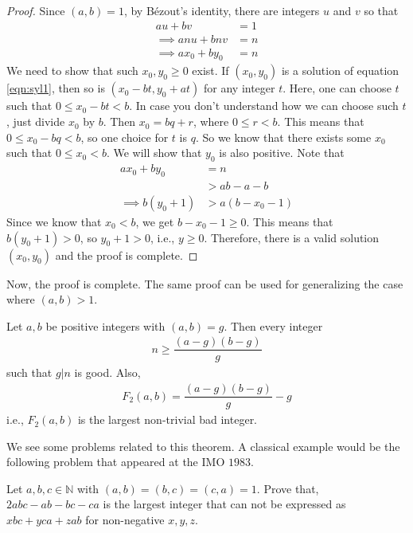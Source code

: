 \documentclass{subfile}
\begin{document}
	\begin{proof}
		Since $(a,b)=1$, by B\'{e}zout's identity, there are integers $u$ and $v$ so that
			\begin{align}
				au+bv
					& = 1\\
				\implies anu+bnv
					& = n\nonumber\\
				\implies ax_0+by_0
					& = n\label{eqn:syl1}
			\end{align}
		We need to show that such $x_0,y_0 \geq 0$ exist. If $(x_0,y_0)$ is a solution of equation \eqref{eqn:syl1}, then so is $(x_0-bt,y_0+at)$ for any integer $t$. Here, one can choose $t$ such that $0 \leq x_0-bt<b$. In case you don't understand how we can choose such $t$, just divide $x_0$ by $b$. Then $x_0=bq+r$, where $0\leq r <b$. This means that $0 \leq x_0 -bq <b$, so one choice for $t$ is $q$. So we know that there exists some $x_0$ such that $0 \leq x_0<b$. We will show that $y_0$ is also positive. Note that
			\begin{align*}
				ax_0+by_0
					& = n\\
					& > ab-a-b\\
				\implies b(y_0+1)
					& > a(b-x_0-1)
			\end{align*}
		Since we know that $x_0<b$, we get $b-x_0-1\geq 0$. This means that $b(y_0+1) >0$, so $y_0+1>0$, i.e., $y\geq0$. Therefore, there is a valid solution $(x_0,y_0)$ and the proof is complete.
	\end{proof}
Now, the proof is complete. The same proof can be used for generalizing the case where $(a,b)>1$.
	\begin{theorem}
		Let $a,b$ be positive integers with $(a,b)=g$. Then every integer
			\begin{align*}
				n\geq\dfrac{(a-g)(b-g)}{g}
			\end{align*}
		such that $g|n$ is good. Also,
			\begin{align*}
				F_2(a,b)=\dfrac{(a-g)(b-g)}{g}-g
			\end{align*}
		i.e., $F_2(a,b)$ is the largest non-trivial bad integer.
	\end{theorem}

We see some problems related to this theorem. A classical example would be the following problem that appeared at the IMO $1983$.
	\begin{problem}[IMO 1983]
		Let $a,b,c\in\mathbb{N}$ with $(a,b)=(b,c)=(c,a)=1$. Prove that, $2abc-ab-bc-ca$ is the largest integer that can not be expressed as $xbc+yca+zab$ for non-negative $x,y,z$.
	\end{problem}
\end{document}

